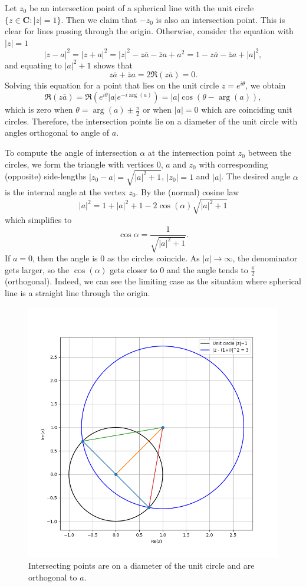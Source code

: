 \documentclass{article}
\begin{document}
Let \(z_0\) be an intersection point of a spherical line with the unit circle \(\{z \in \mathbf{C}:|z| = 1\}\). Then we claim that \(-z_0\) is also an intersection point. This is clear for lines passing through the origin. Otherwise, consider the equation with \(|z| = 1\)
\[ |z-a|^2 = |z+a|^2 = |z|^2 - z\bar{a} - \bar{z}a + a^2 = 1 - z\bar{a} - \bar{z}a + |a|^2, \]
and equating to \(|a|^2 + 1\) shows that
\[ z\bar{a} + \bar{z}a = 2\Re(z\bar{a}) = 0. \]
Solving this equation for a point that lies on the unit circle \(z = e^{i\theta}\), we obtain
\[ \Re(z\bar{a}) = \Re(e^{i\theta}|a|e^{-i\arg(a)}) = |a|\cos(\theta - \arg(a)), \]
which is zero when \(\theta = \arg(a) \pm \frac{\pi}{2}\) or when \(|a| = 0\) which are coinciding unit circles. Therefore, the intersection points lie on a diameter of the unit circle with angles orthogonal to angle of \(a\). 

To compute the angle of intersection \(\alpha\) at the intersection point \(z_0\) between the circles, we form the triangle with vertices \(0\), \(a\) and \(z_0\) with corresponding (opposite) side-lengths \(|z_0 - a| = \sqrt{|a|^2 + 1}\), \(|z_0| = 1\) and \(|a|\). The desired angle \(\alpha\) is the internal angle at the vertex \(z_0\). By the (normal) cosine law
\[ |a|^2 = 1 + |a|^2 + 1 - 2 \cos(\alpha)\sqrt{|a|^2 + 1} \]
which simplifies to
\[ \cos\alpha = \frac{1}{\sqrt{|a|^2 + 1}}. \]
If \(a = 0\), then the angle is \(0\) as the circles coincide. As \(|a| \to \infty\), the denominator gets larger, so the \(\cos(\alpha)\) gets closer to \(0\) and the angle tends to \(\frac{\pi}{2}\) (orthogonal). Indeed, we can see the limiting case as the situation where spherical line is a straight line through the origin.

\begin{figure}
    \centering
    \includegraphics[width=1.0\linewidth]{images/sphere_intersect.png}
    \caption{Intersecting points are on a diameter of the unit circle and are orthogonal to \(a\).}
\end{figure}
\end{document}
